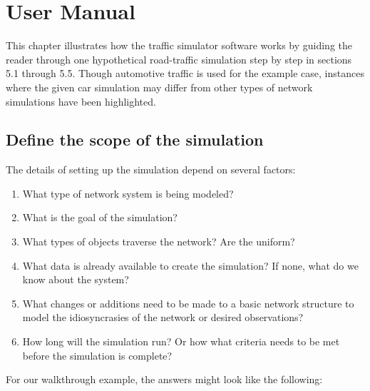 \chapter{User Manual}
\label{Manual}

\par This chapter illustrates how the traffic simulator software works by guiding the reader through one hypothetical road-traffic simulation step by step in sections 5.1 through 5.5.  Though automotive traffic is used for the example case, instances where the given car simulation may differ from other types of network simulations have been highlighted. \\

\section{Define the scope of the simulation}

\par The details of setting up the simulation depend on several factors:

\begin{enumerate}
    \item What type of network system is being modeled?
    \item What is the goal of the simulation? 
    \item What types of objects traverse the network?  Are the uniform?
    \item What data is already available to create the simulation?  If none, what do we know about the system?
    \item What changes or additions need to be made to a basic network structure to model the idiosyncrasies of the network or desired observations?
    \item How long will the simulation run?  Or how what criteria needs to be met before the simulation is complete?
\end{enumerate}

\noindent For our walkthrough example, the answers might look like the following:

